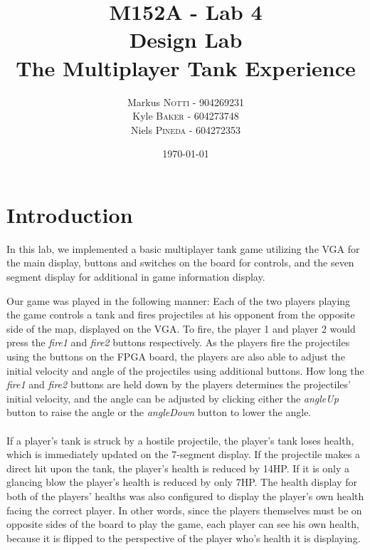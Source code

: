 \documentclass{article}
\title{M152A - Lab 4 \\ Design Lab \\ The Multiplayer Tank Experience} %
\author{Markus \textsc{Notti} - 904269231 \\ Kyle \textsc{Baker}  - 604273748 \\ Niels \textsc{Pineda} - 604272353} %
\date{\today} %
\begin{document}
\maketitle %


\section*{Introduction}


In this lab, we implemented a basic multiplayer tank game utilizing the VGA for the main display, buttons and switches on the board for controls, and the seven segment display for additional in game information display.

Our game was played in the following manner:
Each of the two players playing the game controls a tank and fires projectiles at his opponent from the opposite side of the map, displayed on the VGA.  To fire, the player 1 and player 2 would press the \textit{fire1} and \textit{fire2} buttons respectively. As the players fire the projectiles using the buttons on the FPGA board, the players are also able to adjust the initial velocity and angle of the projectiles using additional buttons.  How long the \textit{fire1} and \textit{fire2} buttons are held down by the players determines the projectiles' initial velocity, and the angle can be adjusted by clicking either the \textit{angleUp} button to raise the angle or the \textit{angleDown} button to lower the angle. 
\\
\\
If a player's tank is struck by a hostile projectile, the player's tank loses health, which is immediately updated on the 7-segment display. If the projectile makes a direct hit upon the tank, the player's health is reduced by 14HP. If it is only a glancing blow the player's health is reduced by only 7HP.  The health display for both of the players' healths was also configured to display the player's own health facing the correct player. In other words, since the players themselves must be on opposite sides of the board to play the game, each player can see his own health, because it is flipped to the perspective of the player who's health it is displaying. 
\end{document}

